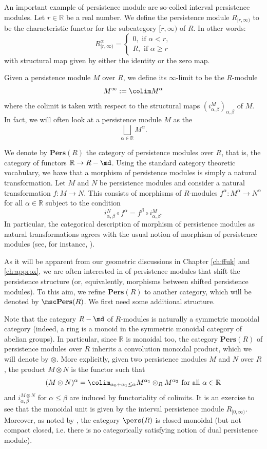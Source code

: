 An important example of persistence module are so-colled interval persistence modules. Let $r\in \mathbb{R}$ be a real number. We define the persistence module $R_{[r,\infty)}$ to be the characteristic functor for the subcategory $[r,\infty)$ of $R$. In other words: $$R_{[r,\infty)}^\alpha= \begin{cases}
    0, \text{  if }\alpha<r,\\
    R, \text{  if }\alpha\geq r
\end{cases}$$
with structural map given by either the identity or the zero map.

Given a persistence module $M$ over $R$, we define its $\infty$-limit to be the $R$-module $$M^\infty:=\colim M^\alpha$$ where the colimit is taken with respect to the structural maps $(i^M_{\alpha,\beta})_{\alpha,\beta}$ of $M$. In fact, we will often look at a persistence module $M$ as the  $$\bigsqcup_{\alpha\in \mathbb{R}}M^\alpha.$$

We denote by $\textbf{Pers}(R)$ the category of persistence modules over $R$, that is, the category of functors $\mathbb{R}\to R-\md$. Using the standard category theoretic vocabulary, we have that a morphism of persistence modules is simply a natural transformation. Let $M$ and $N$ be persistence modules and consider a natural transformation $f\colon M\to N$. This consists of morphisms of $R$-modules $f^\alpha\colon M^\alpha\to N^\alpha$ for all $\alpha \in \mathbb{R}$ subject to the condition $$i^N_{\alpha,\beta}\circ f^\alpha = f^\beta\circ i^M_{\alpha,\beta}.$$ In particular, the categorical description of morphism of persistence modules as natural transformations agrees with the usual notion of morphism of persistence modules (see, for instance, \cite{PRSZ:top-pers}). 

As it will be apparent from our geometric discussions in Chapter \ref{ch:ffuk} and \ref{ch:approx}, we are often interested in  of persistence modules that shift the persistence structure (or, equivalently, morphisms between shifted persistence modules). To this aim, we refine $\textbf{Pers}(R)$ to another category, which will be denoted by $\msc\textbf{Pers}(R)$. We first need some additional structure.  

Note that the category $R-\md$ of $R$-modules is naturally a symmetric monoidal category (indeed, a ring is a monoid in the symmetric monoidal category of abelian groups). In particular, since $\mathbb{R}$ is monoidal too, the category $\mathbf{Pers}(R)$ of persistence modules over $R$ inherits a convolution monoidal product, which we will denote by $\otimes$. More explicitly, given two persistence modules $M$ and $N$ over $R$, the product $M\otimes N$ is the functor such that $$(M\otimes N)^\alpha = \colim_{\alpha_0+\alpha_1\leq \alpha}M^{\alpha_1}\otimes_R M^{\alpha_2}  \text{ for all }\alpha \in \mathbb{R}$$ and $i^{M\otimes N}_{\alpha,\beta}$ for $\alpha\leq \beta$ are induced by functoriality of colimits. It is an exercise to see that the monoidal unit is given by the interval persistence module $R_{[0,\infty)}$. Moreover, as noted by \cite{bubenik2021}, the category $\pers(R)$ is closed monoidal (but not compact closed, i.e. there is no categorically satisfying notion of dual persistence module).

